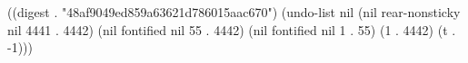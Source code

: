 
((digest . "48af9049ed859a63621d786015aac670") (undo-list nil (nil rear-nonsticky nil 4441 . 4442) (nil fontified nil 55 . 4442) (nil fontified nil 1 . 55) (1 . 4442) (t . -1)))
